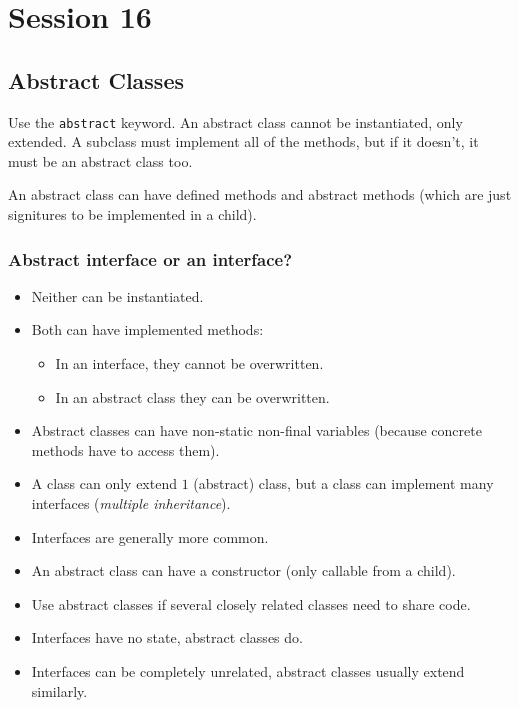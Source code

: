 \section{Session 16}\label{sec:session_16}

\subsection{Abstract Classes}\label{sub:abstract_classes}

Use the \texttt{abstract} keyword.
An abstract class cannot be instantiated, only extended.
A subclass must implement all of the methods, but if it doesn't, it must be an abstract class too.

An abstract class can have defined methods and abstract methods (which are just signitures to be implemented in a child).

\subsubsection{Abstract interface or an interface?}\label{ssub:abstract_interface_or_an_interface_}

\begin{itemize}
    \item Neither can be instantiated.
    \item Both can have implemented methods:
          \begin{itemize}
              \item In an interface, they cannot be overwritten.
              \item In an abstract class they can be overwritten.
          \end{itemize}
    \item Abstract classes can have non-static non-final variables (because concrete methods have to access them).
    \item A class can only extend \(1\) (abstract) class, but a class can implement many interfaces (\emph{multiple inheritance}).
    \item Interfaces are generally more common.
    \item An abstract class can have a constructor (only callable from a child).
    \item Use abstract classes if several closely related classes need to share code.
    \item Interfaces have no state, abstract classes do.
    \item Interfaces can be completely unrelated, abstract classes usually extend similarly.
\end{itemize}
